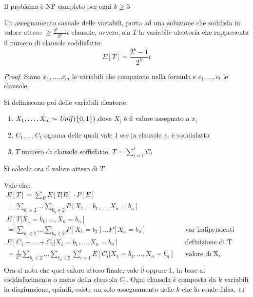 \begin{remark}
    Il problema è NP completo per ogni $k \geq 3$
\end{remark}
\begin{theorem}
    Un assegnamento casuale delle variabili, porta ad una soluzione che 
    soddisfa in valore atteso $\geq \frac{2^k-1}{2^k}t$ clausole, ovvero, 
    sia $T$ la variabile aleatoria che rappresenta il numero di clausole soddisfatte: 
    $$E[T] =\frac{2^k-1}{2^k}t$$
\end{theorem}
\begin{proof}
    Siano $x_1, \dots, x_m$ le variabili che compaiono nella formula e 
    $c_1, \dots ,c_t$ le clausole.

    Si definiscono poi delle variabili aleatorie:
    \begin{enumerate}
        \item $X_1, \dots, X_m\thicksim\mathit{Unif}(\{0,1\}) $,dove $X_i$ è il valore assegnato a $x_i$
        \item $C_1, \dots, C_t$ ognuna delle quali vale 1 sse la clausola $c_i$ è soddisfatta
        \item $T$ numero di clausole soffisfatte, $T = \sum_{i = 1}^{t} C_i$
    \end{enumerate} 
    Si calcola ora il valore atteso di $T$.
    
    Vale che:
    \begin{equation}
        \begin{aligned}
            E[T] = \sum_E E[T|E]\cdot P[E] \\
            = \sum_{b_1 \in 2 } \dots \sum_{b_n \in 2 } P[X_1 = b_1, \dots, X_n = b_n]\\
            E[T|X_1 = b_1, \dots, X_n = b_n]\\
            = \sum_{b_1 \in 2 } \dots \sum_{b_n \in 2 } P[X_1 = b_1] \dots P[X_n = b_n]&& \text{var indipendenti}\\
            E[C_1 + \dots + C_t | X_1 = b_1, \dots, X_n = b_n] && \text{definizione di T}\\
            = \frac{1}{2^n}\sum_{b_1 \in 2 } \dots \sum_{b_n \in 2 } \sum_{i=1}^{t} E[C_i | X_1 = b_1, \dots, X_n = b_n]&& \text{valore di X, linearità v.a.}\\
        \end{aligned}
    \end{equation}
    Ora si nota che quel valore atteso finale, vale 0 oppure 1, in base al soddisfacimento o meno della clausola $C_i$.
    Ogni clausola è composta da $k$ variabili in disgiunzione, quindi, esiste un solo assegnamento delle $k$ che la rende falsa.


\end{proof}
